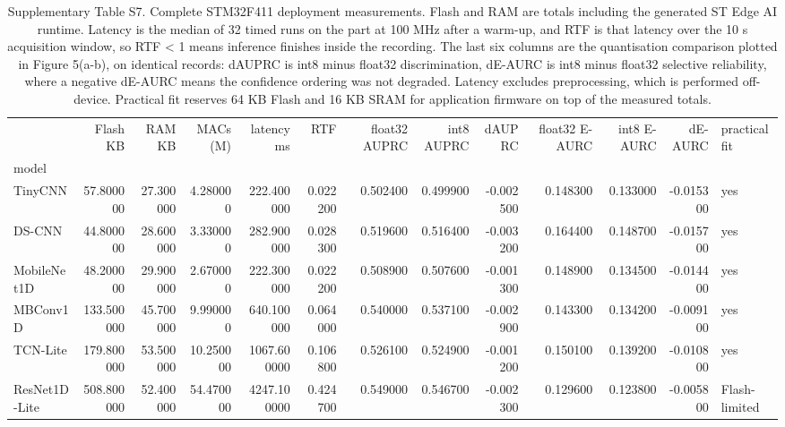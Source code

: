 \begin{table}
\caption{Supplementary Table S7. Complete STM32F411 deployment measurements. Flash and RAM are totals including the generated ST Edge AI runtime. Latency is the median of 32 timed runs on the part at 100 MHz after a warm-up, and RTF is that latency over the 10 s acquisition window, so RTF < 1 means inference finishes inside the recording. The last six columns are the quantisation comparison plotted in Figure 5(a-b), on identical records: dAUPRC is int8 minus float32 discrimination, dE-AURC is int8 minus float32 selective reliability, where a negative dE-AURC means the confidence ordering was not degraded. Latency excludes preprocessing, which is performed off-device. Practical fit reserves 64 KB Flash and 16 KB SRAM for application firmware on top of the measured totals.}
\begin{tabular}{lrrrrrrrrrrrl}
\toprule
 & Flash KB & RAM KB & MACs (M) & latency ms & RTF & float32 AUPRC & int8 AUPRC & dAUPRC & float32 E-AURC & int8 E-AURC & dE-AURC & practical fit \\
model &  &  &  &  &  &  &  &  &  &  &  &  \\
\midrule
TinyCNN & 57.800000 & 27.300000 & 4.280000 & 222.400000 & 0.022200 & 0.502400 & 0.499900 & -0.002500 & 0.148300 & 0.133000 & -0.015300 & yes \\
DS-CNN & 44.800000 & 28.600000 & 3.330000 & 282.900000 & 0.028300 & 0.519600 & 0.516400 & -0.003200 & 0.164400 & 0.148700 & -0.015700 & yes \\
MobileNet1D & 48.200000 & 29.900000 & 2.670000 & 222.300000 & 0.022200 & 0.508900 & 0.507600 & -0.001300 & 0.148900 & 0.134500 & -0.014400 & yes \\
MBConv1D & 133.500000 & 45.700000 & 9.990000 & 640.100000 & 0.064000 & 0.540000 & 0.537100 & -0.002900 & 0.143300 & 0.134200 & -0.009100 & yes \\
TCN-Lite & 179.800000 & 53.500000 & 10.250000 & 1067.600000 & 0.106800 & 0.526100 & 0.524900 & -0.001200 & 0.150100 & 0.139200 & -0.010800 & yes \\
ResNet1D-Lite & 508.800000 & 52.400000 & 54.470000 & 4247.100000 & 0.424700 & 0.549000 & 0.546700 & -0.002300 & 0.129600 & 0.123800 & -0.005800 & Flash-limited \\
\bottomrule
\end{tabular}
\end{table}
